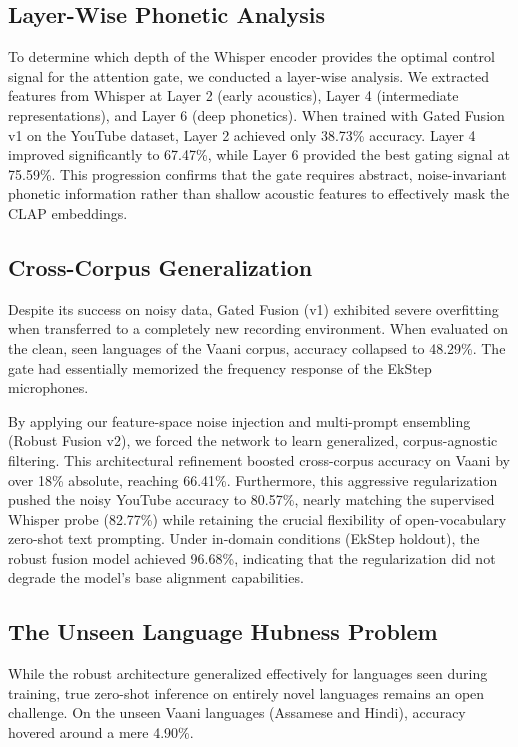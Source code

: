 \documentclass[conference]{IEEEtran}
\begin{document}
\subsection{Layer-Wise Phonetic Analysis}
To determine which depth of the Whisper encoder provides the optimal control signal for the attention gate, we conducted a layer-wise analysis. We extracted features from Whisper at Layer 2 (early acoustics), Layer 4 (intermediate representations), and Layer 6 (deep phonetics). When trained with Gated Fusion v1 on the YouTube dataset, Layer 2 achieved only 38.73\% accuracy. Layer 4 improved significantly to 67.47\%, while Layer 6 provided the best gating signal at 75.59\%. This progression confirms that the gate requires abstract, noise-invariant phonetic information rather than shallow acoustic features to effectively mask the CLAP embeddings.

\subsection{Cross-Corpus Generalization}
Despite its success on noisy data, Gated Fusion (v1) exhibited severe overfitting when transferred to a completely new recording environment. When evaluated on the clean, seen languages of the Vaani corpus, accuracy collapsed to 48.29\%. The gate had essentially memorized the frequency response of the EkStep microphones.

By applying our feature-space noise injection and multi-prompt ensembling (Robust Fusion v2), we forced the network to learn generalized, corpus-agnostic filtering. This architectural refinement boosted cross-corpus accuracy on Vaani by over 18\% absolute, reaching 66.41\%. Furthermore, this aggressive regularization pushed the noisy YouTube accuracy to 80.57\%, nearly matching the supervised Whisper probe (82.77\%) while retaining the crucial flexibility of open-vocabulary zero-shot text prompting. Under in-domain conditions (EkStep holdout), the robust fusion model achieved 96.68\%, indicating that the regularization did not degrade the model's base alignment capabilities.

\subsection{The Unseen Language Hubness Problem}
While the robust architecture generalized effectively for languages seen during training, true zero-shot inference on entirely novel languages remains an open challenge. On the unseen Vaani languages (Assamese and Hindi), accuracy hovered around a mere 4.90\%. 
\end{document}
